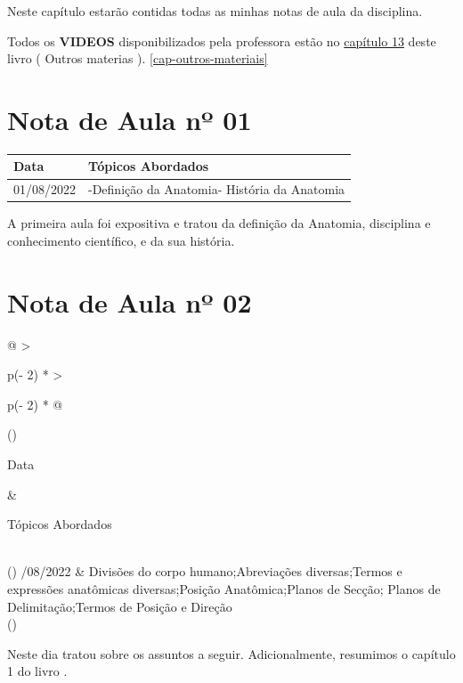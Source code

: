 \documentclass[
]{book}
\begin{document}
Neste capítulo estarão contidas todas as minhas notas de aula da disciplina.

Todos os \textbf{VIDEOS} disponibilizados pela professora estão no \protect\hyperlink{cap-outros-materiais}{capítulo 13} deste livro ( Outros materias ). \ref{cap-outros-materiais}

\hypertarget{nota-de-aula-nuxba-01}{%
\section{Nota de Aula nº 01}\label{nota-de-aula-nuxba-01}}

\begin{longtable}[]{@{}ll@{}}
\toprule()
Data & Tópicos Abordados \\
\midrule()
\endhead
01/08/2022 & -Definição da Anatomia- História da Anatomia \\
\bottomrule()
\end{longtable}

A primeira aula foi expositiva e tratou da definição da Anatomia, disciplina e conhecimento científico, e da sua história.

\hypertarget{nota-de-aula-nuxba-02}{%
\section{Nota de Aula nº 02}\label{nota-de-aula-nuxba-02}}

\begin{longtable}[]{@{}
  >{\raggedright\arraybackslash}p{(\columnwidth - 2\tabcolsep) * }
  >{\raggedright\arraybackslash}p{(\columnwidth - 2\tabcolsep) * }@{}}
\toprule()
\begin{minipage}[b]{\linewidth}\raggedright
Data
\end{minipage} & \begin{minipage}[b]{\linewidth}\raggedright
Tópicos Abordados
\end{minipage} \\
\midrule()
/08/2022 & Divisões do corpo humano;Abreviações diversas;Termos e expressões anatômicas diversas;Posição Anatômica;Planos de Secção; Planos de Delimitação;Termos de Posição e Direção \\
\bottomrule()
\end{longtable}

Neste dia \citet{PROF-SOUSA-2022} tratou sobre os assuntos a seguir. Adicionalmente, resumimos o capítulo 1 do livro \citet{MARIEB-WILHELM-MALLAT-2014}.
\end{document}

